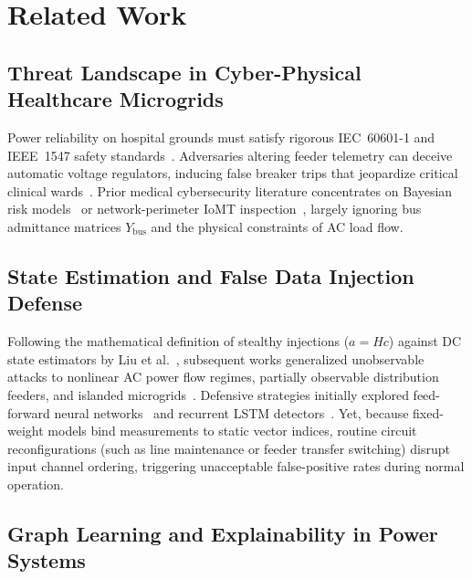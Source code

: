 \documentclass[runningheads]{llncs}
\begin{document}
\section{Related Work}
\label{sec:related}

\subsection{Threat Landscape in Cyber-Physical Healthcare Microgrids}

Power reliability on hospital grounds must satisfy rigorous IEC~60601-1 and IEEE~1547 safety standards~\cite{kruse2017cybersecurity,coventry2018cybersecurity}.
Adversaries altering feeder telemetry can deceive automatic voltage regulators, inducing false breaker trips that jeopardize critical clinical wards~\cite{newaz2021survey}.
Prior medical cybersecurity literature concentrates on Bayesian risk models~\cite{chockalingam2017bayesian} or network-perimeter IoMT inspection~\cite{pirbhulal2023towards}, largely ignoring bus admittance matrices $Y_{\mathrm{bus}}$ and the physical constraints of AC load flow.

\subsection{State Estimation and False Data Injection Defense}

Following the mathematical definition of stealthy injections ($a = Hc$) against DC state estimators by Liu et al.~\cite{liu2011false}, subsequent works generalized unobservable attacks to nonlinear AC power flow regimes, partially observable distribution feeders, and islanded microgrids~\cite{liang2017review,deng2023adversarial,beg2020detection,sahoo2019stealth}.
Defensive strategies initially explored feed-forward neural networks~\cite{he2017real} and recurrent LSTM detectors~\cite{ayad2018detection}.
Yet, because fixed-weight models bind measurements to static vector indices, routine circuit reconfigurations (such as line maintenance or feeder transfer switching) disrupt input channel ordering, triggering unacceptable false-positive rates during normal operation.

\subsection{Graph Learning and Explainability in Power Systems}
\end{document}
